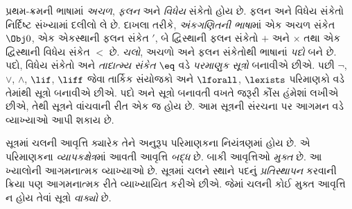 પ્રથમ-ક્રમની ભાષામાં \emph{અચળ}, \emph{ફલન} અને \emph{વિધેય} સંકેતો હોય છે. ફલન અને વિધેય સંકેતો નિર્દિષ્ટ સંખ્યામાં દલીલો લે છે. દાખલા તરીકે, \emph{અંકગણિતની ભાષા}માં એક અચળ સંકેત $\Obj 0$, એક એકસ્થાની ફલન સંકેત $\prime$, બે દ્વિસ્થાની ફલન સંકેતો $+$ અને $\times$ તથા એક દ્વિસ્થાની વિધેય સંકેત $<$ છે. \emph{ચલો}, અચળો અને ફલન સંકેતોથી ભાષાનાં \emph{પદો} બને છે. પદો, વિધેય સંકેતો અને \emph{તાદાત્મ્ય સંકેત} $\eq$ વડે \emph{પરમાણુક સૂત્રો} બનાવીએ છીએ. પછી $ \lnot$, $\lor$, $\land$, $\lif$, $\liff$ જેવા તાર્કિક સંયોજકો અને $\lforall$, $\lexists$ પરિમાણકો વડે તેમાંથી સૂત્રો બનાવીએ છીએ. પદો અને સૂત્રો બનાવતી વખતે જરૂરી કૌંસ હંમેશાં લખીએ છીએ, તેથી સૂત્રને વાંચવાની રીત એક જ હોય છે. આમ સૂત્રની સંરચના પર આગમન વડે વ્યાખ્યાઓ આપી શકાય છે.

સૂત્રમાં ચલની આવૃત્તિ ક્યારેક તેને અનુરૂપ પરિમાણકના નિયંત્રણમાં હોય છે. એ પરિમાણકના \emph{વ્યાપકક્ષેત્ર}માં આવતી આવૃત્તિ \emph{બદ્ધ} છે. બાકી આવૃત્તિઓ \emph{મુક્ત} છે. આ ખ્યાલોની આગમનાત્મક વ્યાખ્યાઓ છે. સૂત્રમાં ચલને સ્થાને પદનું \emph{પ્રતિસ્થાપન} કરવાની ક્રિયા પણ આગમનાત્મક રીતે વ્યાખ્યાયિત કરીએ છીએ. જેમાં ચલની કોઈ મુક્ત આવૃત્તિ ન હોય તેવાં સૂત્રો \emph{વાક્યો} છે.
